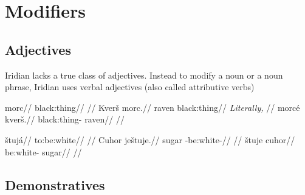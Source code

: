 \chapter{Modifiers}

\section{Adjectives}
Iridian lacks a true class of adjectives. Instead to modify a noun or a noun phrase, Iridian uses verbal adjectives (also called attributive verbs)

\pex
\a
\begingl
\gla morc//
\glb black:thing//
\glft {}//
\endgl
\a
\begingl
\gla Kver\v{s} morc.//
\glb raven black:thing//
\glft {} \emph{Literally,} //
\endgl
\a
\begingl
\gla morc\'e kver\v{s}.//
\glb black:thing- raven//
\glft {}//
\endgl
\xe

\pex
\a
\begingl
\gla \v{s}tuj\'a//
\glb to:be:white//
\glft {}//
\endgl
\a
\begingl
\gla Cuhor je\v{s}tuje.//
\glb sugar -be:white-//
\glft {}//
\endgl
\a
\begingl
\gla \v{s}tuje cuhor//
\glb be:white- sugar//
\glft {}//
\endgl
\xe

\section{Demonstratives}\label{dem-adj}